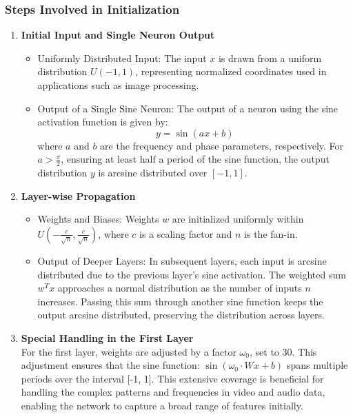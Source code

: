 \documentclass{ioereport}
\begin{document}
    \subsubsection{Steps Involved in Initialization}
    \begin{enumerate}[label=\textbf{\roman*.}]
        \item \textbf{Initial Input and Single Neuron Output}
        \begin{itemize}
            \item Uniformly Distributed Input: The input $x$ is drawn from a uniform distribution $U(-1, 1)$, representing normalized coordinates used in applications such as image processing.
            \item Output of a Single Sine Neuron: The output of a neuron using the sine activation function is given by:
               \begin{equation}
                  y = \sin(ax + b) 
               \end{equation} 
            where $a$ and $b$ are the frequency and phase parameters, respectively. For $a > \frac{\pi}{2}$, ensuring at least half a period of the sine function, the output distribution $y$ is arcsine distributed over $[-1, 1]$.
        \end{itemize}
        \item \textbf{Layer-wise Propagation}
        \begin{itemize}
            \item Weights and Biases: Weights $w$ are initialized uniformly within $U\left(-\frac{c}{\sqrt{n}}, \frac{c}{\sqrt{n}}\right)$, where $c$ is a scaling factor and $n$ is the fan-in.
            \item Output of Deeper Layers: In subsequent layers, each input is arcsine distributed due to the previous layer's sine activation. The weighted sum $w^T x$ approaches a normal distribution as the number of inputs $n$ increases. Passing this sum through another sine function keeps the output arcsine distributed, preserving the distribution across layers.
        \end{itemize}
        \item \textbf{Special Handling in the First Layer} \\
          For the first layer, weights are adjusted by a factor $\omega_0$, set to 30. This adjustment ensures that the sine function: $\sin(\omega_0 \cdot Wx + b)$ spans multiple periods over the interval [-1, 1]. This extensive coverage is beneficial for handling the complex patterns and frequencies in video and audio data, enabling the network to capture a broad range of features initially.        
    \end{enumerate}
\end{document}
